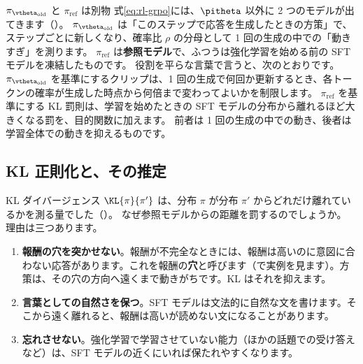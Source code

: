 \begin{intuition}{$\pi_{\vtheta_{\text{old}}}$ と $\pi_{\text{ref}}$ は別物}
式\eqref{eq:rl-grpo}には、$\pitheta$ 以外に 2 つのモデルが出てきます（）。
$\pi_{\vtheta_{\text{old}}}$ は「このステップで応答を生成したときの方策」で、ステップごとに新しくなり、確率比 $\rho$ の分母として 1 回の生成の中での「動きすぎ」を測ります。
$\pi_{\text{ref}}$ は\textbf{参照モデル}で、ふつうは強化学習を始める前の SFT モデルを凍結したものです。
役割を平らな言葉で言うと、次のとおりです。
$\pi_{\vtheta_{\text{old}}}$ を基準にするクリップは、1 回の生成で何回か更新するとき、各トークンの確率が生成した時点から何倍まで変わってよいかを制限します。
$\pi_{\text{ref}}$ を基準にする KL 罰則は、学習を始めたときの SFT モデルの分布から離れるほど大きくなる罰を、目的関数に加えます。
前者は 1 回の生成の中での動き、後者は学習全体での動きを抑えるものです。
\end{intuition}

\subsection{KL 正則化と、その推定}

KL ダイバージェンス $\KL{\pi}{\pi'}$ は、分布 $\pi$ が分布 $\pi'$ からどれだけ離れているかを測る量でした（）。
なぜ参照モデルからの距離を罰するのでしょうか。
理由は三つあります。
\begin{enumerate}
\item \textbf{報酬の穴を突かせない}。報酬が不完全なときには、報酬は高いのに意図に合わない応答があります。これを報酬の\textbf{穴}と呼びます（で実例を見ます）。方策は、その穴の方向へ遠くまで動きがちです。KL はそれを抑えます。
\item \textbf{言葉としての自然さを保つ}。SFT モデルは文法的に自然な文を書けます。そこから遠く離れると、報酬は高いが読めない文になることがあります。
\item \textbf{忘れさせない}。強化学習で学習させていない能力（ほかの話題での受け答えなど）は、SFT モデルの近くにいれば保たれやすくなります。
\end{enumerate}


